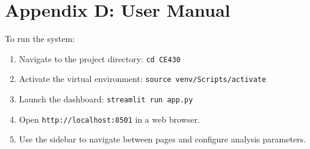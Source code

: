\documentclass{CLS_zhou430}
\begin{document}
\section{Appendix D: User Manual}
To run the system:
\begin{enumerate}
    \item Navigate to the project directory: \texttt{cd CE430}
    \item Activate the virtual environment: \texttt{source venv/Scripts/activate}
    \item Launch the dashboard: \texttt{streamlit run app.py}
    \item Open \texttt{http://localhost:8501} in a web browser.
    \item Use the sidebar to navigate between pages and configure analysis parameters.
\end{enumerate}
\end{document}
